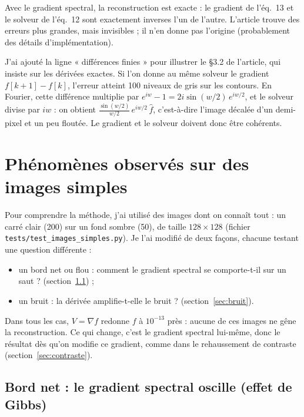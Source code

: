 \documentclass[11pt,a4paper]{article}
\newcommand{\ft}[1]{\widehat{#1}}
\begin{document}
Avec le gradient spectral, la reconstruction est exacte : le gradient de l'éq.~13 et le solveur de
l'éq.~12 sont exactement inverses l'un de l'autre. L'article trouve des erreurs plus grandes, mais
invisibles ; il n'en donne pas l'origine (probablement des détails d'implémentation).

J'ai ajouté la ligne « différences finies » pour illustrer le §3.2 de l'article, qui insiste sur les
dérivées exactes. Si l'on donne au même solveur le gradient $f[k+1]-f[k]$, l'erreur atteint 100 niveaux
de gris sur les contours. En Fourier, cette différence multiplie par
$e^{iw}-1 = 2i\sin(w/2)\,e^{iw/2}$, et le solveur divise par $iw$ : on obtient
$\frac{\sin(w/2)}{w/2}\,e^{iw/2}\,\ft f$, c'est-à-dire l'image décalée d'un demi-pixel et un peu
floutée. Le gradient et le solveur doivent donc être cohérents.

\section{Phénomènes observés sur des images simples}\label{sec:phenomenes}

Pour comprendre la méthode, j'ai utilisé des images dont on connaît tout : un carré clair (200) sur un
fond sombre (50), de taille $128\times128$ (fichier \texttt{tests/test\_images\_simples.py}). Je l'ai
modifié de deux façons, chacune testant une question différente :
\begin{itemize}
  \item un bord net ou flou : comment le gradient spectral se comporte-t-il sur un saut ?
  (section~\ref{sec:gibbs}) ;
  \item un bruit : la dérivée amplifie-t-elle le bruit ? (section~\ref{sec:bruit}).
\end{itemize}
Dans tous les cas, $V=\nabla f$ redonne $f$ à $10^{-13}$ près : aucune de ces images ne gêne la
reconstruction. Ce qui change, c'est le gradient spectral lui-même, donc le résultat dès qu'on modifie ce
gradient, comme dans le rehaussement de contraste (section~\ref{sec:contraste}).

\subsection{Bord net : le gradient spectral oscille (effet de Gibbs)}\label{sec:gibbs}
\end{document}
